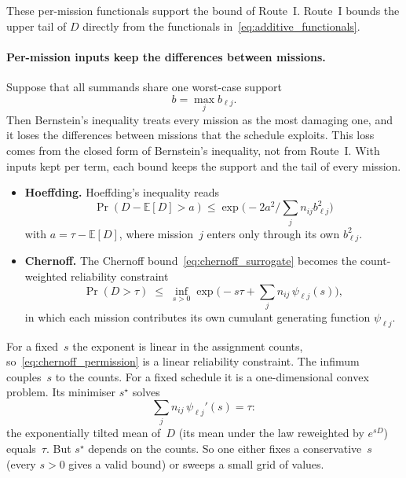 \documentclass[11pt,a4paper]{article}
\theoremstyle{plain}
\theoremstyle{definition}
\theoremstyle{remark}
\begin{document}
These per-mission functionals support the bound of Route~I.
Route~I bounds the upper tail of $D$ directly from the functionals in~\eqref{eq:additive_functionals}.

\paragraph{Per-mission inputs keep the differences between missions.}
Suppose that all summands share one worst-case support
\begin{equation}
  b = \max_j b_{\ell j}.
\end{equation}
Then Bernstein's inequality treats every mission as the most damaging one, and it loses the differences between missions that the schedule exploits.
This loss comes from the closed form of Bernstein's inequality, not from Route~I.
With inputs kept per term, each bound keeps the support and the tail of every mission.
\begin{itemize}
  \item \textbf{Hoeffding.} Hoeffding's inequality reads
    \begin{equation}
      \Pr(D - \mathbb{E}[D] > a) \le \exp\!\big( -2a^2 / \sum_j n_{ij} b_{\ell j}^2 \big)
    \end{equation}
    with $a = \tau - \mathbb{E}[D]$, where mission~$j$ enters only through its own $b_{\ell j}^2$.
  \item \textbf{Chernoff.} The Chernoff bound~\eqref{eq:chernoff_surrogate} becomes the count-weighted reliability constraint
\begin{equation}\label{eq:chernoff_permission}
  \Pr(D > \tau) \;\le\; \inf_{s > 0} \exp\!\Big( -s\tau + \sum_j n_{ij}\,\psi_{\ell j}(s) \Big),
\end{equation}
    in which each mission contributes its own cumulant generating function $\psi_{\ell j}$.
\end{itemize}

For a fixed~$s$ the exponent is linear in the assignment counts, so~\eqref{eq:chernoff_permission} is a linear reliability constraint.
The infimum couples~$s$ to the counts.
For a fixed schedule it is a one-dimensional convex problem.
Its minimiser $s^\star$ solves
\begin{equation}
  \sum_j n_{ij}\,\psi_{\ell j}'(s) = \tau:
\end{equation}
the exponentially tilted mean of~$D$ (its mean under the law reweighted by $e^{sD}$) equals~$\tau$.
But $s^\star$ depends on the counts.
So one either fixes a conservative~$s$ (every $s > 0$ gives a valid bound) or sweeps a small grid of values.
\end{document}
